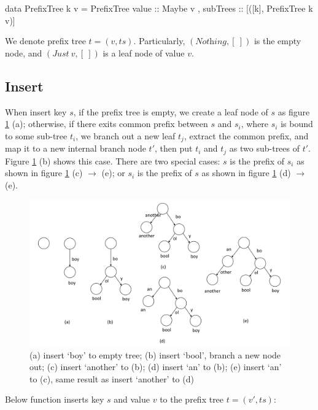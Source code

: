 \documentclass[b5paper]{article}
\begin{document}
\begin{Haskell}
data PrefixTree k v = PrefixTree { value :: Maybe v
                                 , subTrees :: [([k], PrefixTree k v)]}
\end{Haskell}

We denote prefix tree $t = (v, ts)$. Particularly, $(\textit{Nothing}, [\ ])$ is the empty node, and $(\textit{Just}\ v, [\ ])$ is a leaf node of value $v$.

\subsection{Insert}
When insert key $s$, if the prefix tree is empty, we create a leaf node of $s$ as figure \ref{fig:patricia-insert} (a); otherwise, if there exits common prefix between $s$ and $s_i$, where $s_i$ is bound to some sub-tree $t_i$, we branch out a new leaf $t_j$, extract the common prefix, and map it to a new internal branch node $t'$, then put $t_i$ and $t_j$ as two sub-trees of $t'$. Figure \ref{fig:patricia-insert} (b) shows this case. There are two special cases: $s$ is the prefix of $s_i$ as shown in figure \ref{fig:patricia-insert} (c) $\to$ (e); or $s_i$ is the prefix of $s$ as shown in figure \ref{fig:patricia-insert} (d) $\to$ (e).

\begin{figure}[htbp]
  \centering
  \includegraphics[scale=0.4]{img/prefix-tree-insert}
  \caption{(a) insert `boy' to empty tree; (b) insert `bool', branch a new node out; (c) insert `another' to (b); (d) insert `an' to (b); (e) insert `an' to (c), same result as insert `another' to (d)}
  \label{fig:patricia-insert}
\end{figure}

Below function inserts key $s$ and value $v$ to the prefix tree $t = (v', ts)$:
\end{document}
